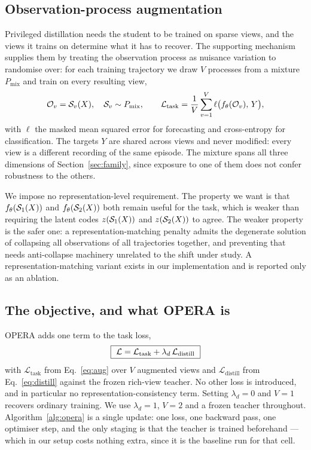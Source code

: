 \subsection{Observation-process augmentation}
\label{sec:aug}
Privileged distillation needs the student to be trained on sparse views, and the views it trains on determine what
it has to recover. The supporting mechanism supplies them by treating the observation process as nuisance
variation to randomise over: for each training trajectory we draw $V$ processes from a mixture $P_{\mathrm{mix}}$
and train on every resulting view,
\begin{equation}
\mathcal{O}_v=\mathcal{S}_v(X),\quad \mathcal{S}_v\sim P_{\mathrm{mix}},\qquad
\mathcal{L}_{\mathrm{task}}=\frac1V\sum_{v=1}^{V}\ell\big(f_\theta(\mathcal{O}_v),\,Y\big),
\label{eq:aug}
\end{equation}
with $\ell$ the masked mean squared error for forecasting and cross-entropy for classification. The targets $Y$
are shared across views and never modified: every view is a different recording of the same episode. The mixture
spans all three dimensions of Section~\ref{sec:family}, since exposure to one of them does not confer robustness
to the others.

We impose no representation-level requirement. The property we want is that $f_\theta(\mathcal{S}_1(X))$ and
$f_\theta(\mathcal{S}_2(X))$ both remain useful for the task, which is weaker than requiring the latent codes
$z(\mathcal{S}_1(X))$ and $z(\mathcal{S}_2(X))$ to agree. The weaker property is the safer one: a representation-matching
penalty admits the degenerate solution of collapsing all observations of all trajectories together, and preventing
that needs anti-collapse machinery unrelated to the shift under study. A representation-matching variant exists in
our implementation and is reported only as an ablation.

\subsection{The objective, and what OPERA is}
OPERA adds one term to the task loss,
\begin{equation}
\fbox{$\displaystyle\ \mathcal{L}=\mathcal{L}_{\mathrm{task}}+\lambda_{d}\,\mathcal{L}_{\mathrm{distill}}\ $}
\label{eq:objective}
\end{equation}
with $\mathcal{L}_{\mathrm{task}}$ from Eq.~\ref{eq:aug} over $V$ augmented views and
$\mathcal{L}_{\mathrm{distill}}$ from Eq.~\ref{eq:distill} against the frozen rich-view teacher. No other loss is
introduced, and in particular no representation-consistency term. Setting $\lambda_d=0$ and $V=1$ recovers
ordinary training. We use $\lambda_d=1$, $V=2$ and a frozen teacher throughout. Algorithm~\ref{alg:opera} is a
single update: one loss, one backward pass, one optimiser step, and the only staging is that the teacher is
trained beforehand --- which in our setup costs nothing extra, since it is the baseline run for that cell.

